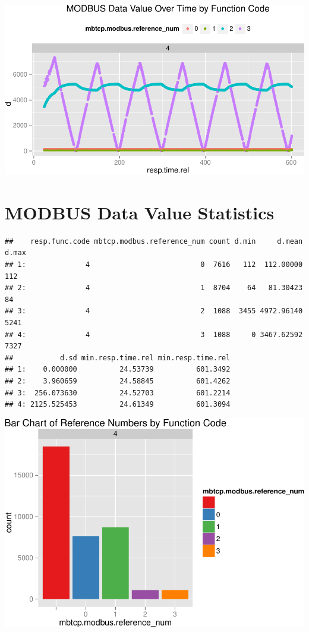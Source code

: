\documentclass[]{article}
\begin{document}
\includegraphics{modbus_files/figure-latex/unnamed-chunk-20-1.pdf}

\pagebreak

\section{MODBUS Data Value
Statistics}\label{modbus-data-value-statistics}

\begin{verbatim}
##    resp.func.code mbtcp.modbus.reference_num count d.min     d.mean d.max
## 1:              4                          0  7616   112  112.00000   112
## 2:              4                          1  8704    64   81.30423    84
## 3:              4                          2  1088  3455 4972.96140  5241
## 4:              4                          3  1088     0 3467.62592  7327
##           d.sd min.resp.time.rel min.resp.time.rel
## 1:    0.000000          24.53739          601.3492
## 2:    3.960659          24.58845          601.4262
## 3:  256.073630          24.52703          601.2214
## 4: 2125.525453          24.61349          601.3094
\end{verbatim}

\begin{center}\includegraphics{modbus_files/figure-latex/unnamed-chunk-22-1} \end{center}
\end{document}
